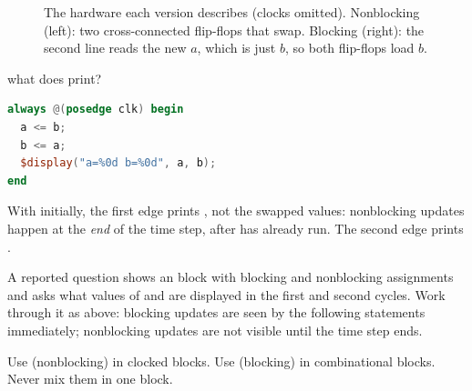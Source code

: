 \begin{figure}[h]
\centering
{}
\caption{The hardware each version describes (clocks omitted). Nonblocking (left): two cross-connected flip-flops that swap. Blocking (right): the second line reads the new $a$, which is just $b$, so both flip-flops load $b$.}
\label{fig:blocking}
\end{figure}

\begin{worked}{what does  print?}
\begin{lstlisting}[language=Verilog]
always @(posedge clk) begin
  a <= b;
  b <= a;
  $display("a=%0d b=%0d", a, b);
end
\end{lstlisting}
With  initially, the first edge prints , not the swapped values: nonblocking updates happen at the \emph{end} of the time step, after  has already run. The second edge prints .
\end{worked}

\begin{onoa}
A reported question shows an  block with blocking and nonblocking assignments and asks what values of  and  are displayed in the first and second cycles. Work through it as above: blocking updates are seen by the following statements immediately; nonblocking updates are not visible until the time step ends.
\end{onoa}

\begin{remember}
Use \code{<=} (nonblocking) in clocked  blocks. Use \code{=} (blocking) in combinational  blocks. Never mix them in one block.
\end{remember}

